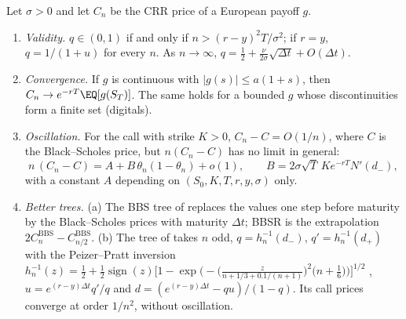 \begin{proposition}\label{prop:fd-binomial}
Let $\sigma>0$ and let $C_n$ be the CRR price of a European payoff $g$.
\begin{enumerate}[label=(\roman*)]
  \item \emph{Validity.} $q\in(0,1)$ if and only if $n>(r-y)^2T/\sigma^2$; if $r=y$, $q=1/(1+u)$ for
    every $n$. As $n\to\infty$, $q=\frac12+\frac{\nu}{2\sigma}\sqrt{\Delta t}+O(\Delta t)$.
  \item \emph{Convergence.} If $g$ is continuous with $|g(s)|\le a(1+s)$, then
    $C_n\to e^{-rT}\EQ[g(S_T)]$. The same holds for a bounded $g$ whose discontinuities form a
    finite set (digitals).
  \item \emph{Oscillation.} For the call with strike $K>0$, $C_n-C=O(1/n)$, where $C$ is the
    Black--Scholes price, but $n(C_n-C)$ has no limit in general:
    \begin{equation}\label{eq:fd-oscillation}
      n\,(C_n-C)=A+B\,\theta_n(1-\theta_n)+o(1),\qquad B=2\sigma\sqrt T\,Ke^{-rT}N'(d_-),
    \end{equation}
    with a constant $A$ depending on $(S_0,K,T,r,y,\sigma)$ only.
  \item \emph{Better trees.} (a) The BBS tree of \textcite{broadie-detemple} replaces the values one
    step before maturity by the Black--Scholes prices with maturity $\Delta t$; BBSR is the
    extrapolation $2C^{\mathrm{BBS}}_n-C^{\mathrm{BBS}}_{n/2}$. (b) The tree of
    \textcite{leisen-reimer-1996} takes $n$ odd, $q=h_n^{-1}(d_-)$, $q'=h_n^{-1}(d_+)$ with the
    Peizer--Pratt inversion $h_n^{-1}(z)=\frac12+\frac12\operatorname{sign}(z)
    \big[1-\exp\big(-\big(\frac{z}{n+1/3+0.1/(n+1)}\big)^2\big(n+\frac16\big)\big)\big]^{1/2}$
    \citep{peizer-pratt-1968}, $u=e^{(r-y)\Delta t}q'/q$ and $d=(e^{(r-y)\Delta t}-qu)/(1-q)$. Its call
    prices converge at order $1/n^2$, without oscillation.
\end{enumerate}
\end{proposition}

